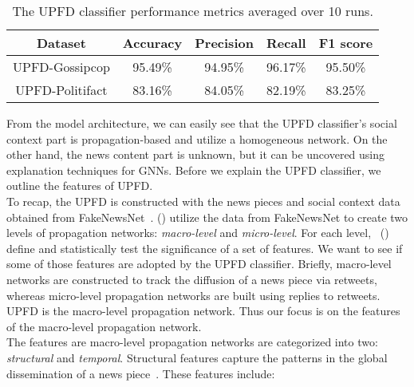 \begin{table}
    \centering
    \begin{tabular}{c | c | c | c | c}
        \textbf{Dataset} & \textbf{Accuracy} & \textbf{Precision} & \textbf{Recall} & \textbf{F1 score} \\
        \hline
        UPFD-Gossipcop   & 95.49\%           & 94.95\%            & 96.17\%         & 95.50\%           \\
        \hline
        UPFD-Politifact  & 83.16\%           & 84.05\%            & 82.19\%         & 83.25\%           \\
    \end{tabular}
    \caption[The UPFD classifier performance metrics averaged over 10 runs.]{The UPFD classifier performance metrics averaged over 10 runs.}
    \label{tab:UPFDClassifier_Results}
\end{table}
From the model architecture, we can easily see that the UPFD classifier's social context part is propagation-based and utilize a homogeneous network. On the other hand, the news content part is unknown, but it can be uncovered using explanation techniques for GNNs. Before we explain the UPFD classifier, we outline the features of UPFD.\\
To recap, the UPFD is constructed with the news pieces and social context data obtained from FakeNewsNet~\parencite{FakeNewsNet_Shu}. \citeauthor{HierarchicalPropagationNetworksForFND_Shu} (\citeyear{HierarchicalPropagationNetworksForFND_Shu}) utilize the data from FakeNewsNet to create two levels of propagation networks: \emph{macro-level} and \emph{micro-level}. For each level,~\citeauthor{HierarchicalPropagationNetworksForFND_Shu} (\citeyear{HierarchicalPropagationNetworksForFND_Shu}) define and statistically test the significance of a set of features. We want to see if some of those features are adopted by the UPFD classifier. Briefly, macro-level networks are constructed to track the diffusion of a news piece via retweets, whereas micro-level propagation networks are built using replies to retweets. UPFD is the macro-level propagation network. Thus our focus is on the features of the macro-level propagation network.\\
The features are macro-level propagation networks are categorized into two: \emph{structural} and \emph{temporal}. Structural features capture the patterns in the global dissemination of a news piece~\parencite{HierarchicalPropagationNetworksForFND_Shu}. These features include:
